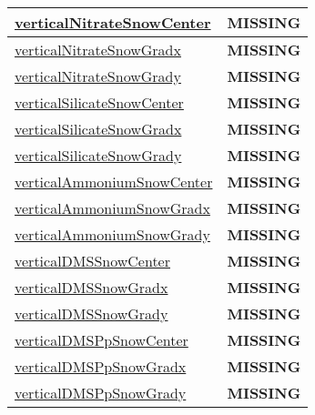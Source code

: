 {\begin{center}
\begin{longtable}{| p{2.0in} | p{4.0in} |}
    \hline
    \hyperref[subsec:var_sec_tracer_reconstruction_verticalNitrateSnowCenter]{verticalNitrateSnowCenter} & {\bf \color{red} MISSING} \\
    \hline
    \hyperref[subsec:var_sec_tracer_reconstruction_verticalNitrateSnowGradx]{verticalNitrateSnowGradx} & {\bf \color{red} MISSING} \\
    \hline
    \hyperref[subsec:var_sec_tracer_reconstruction_verticalNitrateSnowGrady]{verticalNitrateSnowGrady} & {\bf \color{red} MISSING} \\
    \hline
    \hyperref[subsec:var_sec_tracer_reconstruction_verticalSilicateSnowCenter]{verticalSilicateSnowCenter} & {\bf \color{red} MISSING} \\
    \hline
    \hyperref[subsec:var_sec_tracer_reconstruction_verticalSilicateSnowGradx]{verticalSilicateSnowGradx} & {\bf \color{red} MISSING} \\
    \hline
    \hyperref[subsec:var_sec_tracer_reconstruction_verticalSilicateSnowGrady]{verticalSilicateSnowGrady} & {\bf \color{red} MISSING} \\
    \hline
    \hyperref[subsec:var_sec_tracer_reconstruction_verticalAmmoniumSnowCenter]{verticalAmmoniumSnowCenter} & {\bf \color{red} MISSING} \\
    \hline
    \hyperref[subsec:var_sec_tracer_reconstruction_verticalAmmoniumSnowGradx]{verticalAmmoniumSnowGradx} & {\bf \color{red} MISSING} \\
    \hline
    \hyperref[subsec:var_sec_tracer_reconstruction_verticalAmmoniumSnowGrady]{verticalAmmoniumSnowGrady} & {\bf \color{red} MISSING} \\
    \hline
    \hyperref[subsec:var_sec_tracer_reconstruction_verticalDMSSnowCenter]{verticalDMSSnowCenter} & {\bf \color{red} MISSING} \\
    \hline
    \hyperref[subsec:var_sec_tracer_reconstruction_verticalDMSSnowGradx]{verticalDMSSnowGradx} & {\bf \color{red} MISSING} \\
    \hline
    \hyperref[subsec:var_sec_tracer_reconstruction_verticalDMSSnowGrady]{verticalDMSSnowGrady} & {\bf \color{red} MISSING} \\
    \hline
    \hyperref[subsec:var_sec_tracer_reconstruction_verticalDMSPpSnowCenter]{verticalDMSPpSnowCenter} & {\bf \color{red} MISSING} \\
    \hline
    \hyperref[subsec:var_sec_tracer_reconstruction_verticalDMSPpSnowGradx]{verticalDMSPpSnowGradx} & {\bf \color{red} MISSING} \\
    \hline
    \hyperref[subsec:var_sec_tracer_reconstruction_verticalDMSPpSnowGrady]{verticalDMSPpSnowGrady} & {\bf \color{red} MISSING} \\

\end{longtable}
\end{center}}
